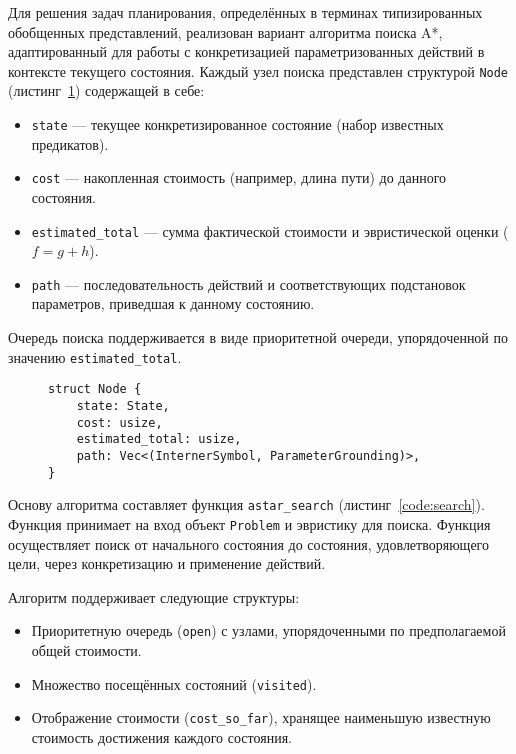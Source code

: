 \documentclass{article}
\begin{document}
Для решения задач планирования, определённых в терминах типизированных обобщенных представлений,
реализован вариант алгоритма поиска A*, адаптированный для работы с конкретизацией параметризованных действий в контексте текущего состояния.
Каждый узел поиска представлен структурой \texttt{Node} (листинг~\ref{code:node}) содержащей в себе:

\begin{itemize}
    \item \texttt{state} --- текущее конкретизированное состояние (набор известных предикатов).
    \item \texttt{cost} --- накопленная стоимость (например, длина пути) до данного состояния.
    \item \texttt{estimated\_total} --- сумма фактической стоимости и эвристической оценки ($f = g + h$).
    \item \texttt{path} --- последовательность действий и соответствующих подстановок параметров, приведшая к данному состоянию.
\end{itemize}
Очередь поиска поддерживается в виде приоритетной очереди, упорядоченной по значению \texttt{estimated\_total}.

\begin{figure}
  \begin{verbatim}
struct Node {
    state: State,
    cost: usize,
    estimated_total: usize,
    path: Vec<(InternerSymbol, ParameterGrounding)>,
}
  \end{verbatim}
  \label{code:node}
\end{figure}


Основу алгоритма составляет функция \texttt{astar\_search} (листинг~\ref{code:search}).
Функция принимает на вход объект \texttt{Problem} и эвристику для поиска.
Функция осуществляет поиск от начального состояния до состояния, удовлетворяющего цели, через конкретизацию и применение действий.

Алгоритм поддерживает следующие структуры:
\begin{itemize}
    \item Приоритетную очередь (\texttt{open}) с узлами, упорядоченными по предполагаемой общей стоимости.
    \item Множество посещённых состояний (\texttt{visited}).
    \item Отображение стоимости (\texttt{cost\_so\_far}), хранящее наименьшую известную стоимость достижения каждого состояния.
\end{itemize}
\end{document}
